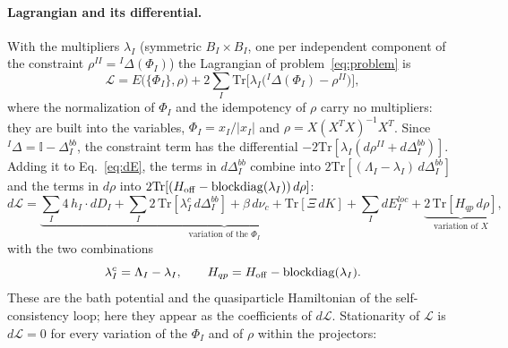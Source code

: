\documentclass[11pt]{article}
\newcommand{\Tr}{\mathrm{Tr}}
\begin{document}
\paragraph{Lagrangian and its differential.} With the multipliers $\lambda_I$ (symmetric $B_I\times B_I$, one per independent component of the constraint $\rho^{II}={}^I\Delta(\Phi_I)$)
the Lagrangian of problem~\eqref{eq:problem} is
\begin{equation}
\mathcal L=E\big(\{\Phi_I\},\rho\big)+2\sum_I\Tr\!\big[\lambda_I\big({}^I\Delta(\Phi_I)-\rho^{II}\big)\big],
\label{eq:Lagr}
\end{equation}
where the normalization of $\Phi_I$ and the idempotency of $\rho$ carry no multipliers: they are built into the variables, $\Phi_I=x_I/|x_I|$ and $\rho=X(X^TX)^{-1}X^T$.
Since ${}^I\Delta=\mathbb I-\Delta^{bb}_I$, the constraint term has the differential $-2\Tr[\lambda_I(d\rho^{II}+d\Delta^{bb}_I)]$. Adding it to Eq.~\eqref{eq:dE}, the terms in $d\Delta^{bb}_I$ combine into $2\Tr[(\Lambda_I-\lambda_I)\,d\Delta^{bb}_I]$ and
the terms in $d\rho$ into $2\Tr[(H_{\rm off}-\mathrm{blockdiag}(\lambda_I))\,d\rho]$:
\begin{equation}
d\mathcal L=\underbrace{\sum_I4\,h_I\!\cdot\!dD_I+\sum_I2\,\Tr[\lambda^c_I\,d\Delta^{bb}_I]+\beta\,d\nu_c+\Tr[\Xi\,dK]+\sum_IdE^{loc}_I}_{\text{variation of the }\Phi_I}
+\underbrace{2\,\Tr[H_{qp}\,d\rho]}_{\text{variation of }X},
\label{eq:dL}
\end{equation}
with the two combinations
\begin{equation}
\lambda^c_I=\Lambda_I-\lambda_I,\qquad H_{qp}=H_{\rm off}-\mathrm{blockdiag}(\lambda_I).
\end{equation}
These are the bath potential and the quasiparticle Hamiltonian of the self-consistency loop; here they appear as the coefficients of $d\mathcal L$. Stationarity of $\mathcal L$ is
$d\mathcal L=0$ for every variation of the $\Phi_I$ and of $\rho$ within the projectors:
\end{document}
